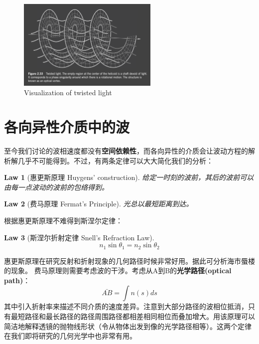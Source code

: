 \documentclass[12pt]{ctexart}%
\newtheorem{theorem}{Law}
\begin{document}
\begin{figure}
    \centering
    \includegraphics[width=0.6\textwidth]{Image/1_twisted_wave.png}
    \caption{Visualization of twisted light}
    \label{twisted_wave}
\end{figure}

\section*{各向异性介质中的波}
至今我们讨论的波相速度都没有\textbf{空间依赖性}，而各向异性的介质会让波动方程的解析解几乎不可能得到。不过，有两条定律可以大大简化我们的分析：
\begin{theorem}[惠更斯原理 Huygens’ construction]
    给定一时刻的波前，其后的波前可以由每一点波动的波前的包络得到。
\end{theorem}
\begin{theorem}[费马原理 Fermat’s Principle]
    光总以最短距离到达。
\end{theorem}
根据惠更斯原理不难得到斯涅尔定律：
\begin{theorem}[斯涅尔折射定律 Snell's Refraction Law]
    \begin{equation}
        n_1\sin{\theta_1}=n_2\sin{\theta_2}
    \end{equation}
\end{theorem}
\indent 惠更斯原理在研究反射和折射现象的几何路径时候非常好用。据此可分析海市蜃楼的现象。
费马原理则需要考虑波的干涉。考虑从A到B的\textbf{光学路径(optical path)}：
\begin{equation}
    \bar{AB}=\int n(s)ds
\end{equation}
其中引入折射率来描述不同介质的速度差异。注意到大部分路径的波相位抵消，只有最短路径和最长路径的路径周围路径都相差相同相位而叠加增大。用该原理可以简洁地解释透镜的抛物线形状（令从物体出发到像的光学路径相等）。这两个定律在我们即将研究的几何光学中也非常有用。
\end{document}
